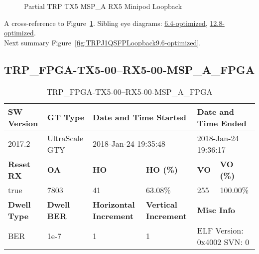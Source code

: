 \begin{figure}[h]
\begin{subfigure}{0.5\textwidth}
\hyperref[sec:TRPFPGATX506RX506MSPAFPGA9.6-optimized]{}
\end{subfigure}\hspace*{\fill}
\begin{subfigure}{0.5\textwidth}
\hyperref[sec:TRPFPGATX507RX507MSPAFPGA9.6-optimized]{}
\end{subfigure}

\caption{Partial TRP TX5 MSP\_A RX5 Minipod Loopback} \label{fig:PartialTRPTX5MSPARX5MinipodLoopback9.6-optimized}
\end{figure}

A cross-reference to Figure~\ref{fig:PartialTRPTX5MSPARX5MinipodLoopback9.6-optimized}.
Sibling eye diagrams: \hyperref[sec:PartialTRPTX5MSPARX5MinipodLoopback6.4-optimized]{6.4-optimized}, \hyperref[sec:PartialTRPTX5MSPARX5MinipodLoopback12.8-optimized]{12.8-optimized}. \\
Next summary Figure~\ref{fig:TRPJ1QSFPLoopback9.6-optimized}.
\clearpage
% 
\subsection{TRP\_FPGA-TX5-00--RX5-00-MSP\_A\_FPGA}\label{sec:TRPFPGATX500RX500MSPAFPGA9.6-optimized}

\begin{table}[h]
\centering
\caption{TRP\_FPGA-TX5-00--RX5-00-MSP\_A\_FPGA}
\label{tab:TRPFPGATX500RX500MSPAFPGA9.6-optimized}
\begin{tabular}{@{}|l|l|l|l|l|l|@{}}
\toprule
\textbf{SW Version}                & \textbf{GT Type}   & \multicolumn{2}{l|}{\textbf{Date and Time Started}}            & \multicolumn{2}{l|}{\textbf{Date and Time Ended}}        \\ \midrule
2017.2                       & UltraScale GTY          & \multicolumn{2}{l|}{2018-Jan-24 19:35:48}                   & \multicolumn{2}{l|}{2018-Jan-24 19:36:17}               \\ \midrule
\textbf{Reset RX}                  & \textbf{OA} & \textbf{HO}   & \textbf{HO (\%)} & \textbf{VO} & \textbf{VO (\%)} \\ \midrule
true & 7803        & 41          & 63.08\%        & 255        & 100.00\%       \\ \midrule
\textbf{Dwell Type}                & \textbf{Dwell BER} & \textbf{Horizontal Increment} & \textbf{Vertical Increment}    & \multicolumn{2}{l|}{\textbf{Misc Info}}                  \\ \midrule
BER                            & 1e-7        & 1        & 1           & \multicolumn{2}{l|}{ELF Version: 0x4002 SVN: 0}                         \\ \bottomrule
\end{tabular}
\end{table}

